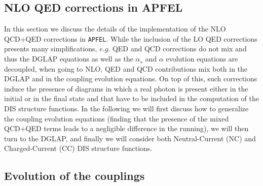 \newpage



\appendix

\begin{widetext}
\section{NLO QED corrections in APFEL} \label{sec:appendixAPFEL}

In this section we discuss the details of the implementation of the
NLO QCD+QED corrections in {\tt APFEL}. While the inclusion of the LO
QED corrections presents many simplifications, $e.g.$ QED and QCD
corrections do not mix and thus the DGLAP equations as well as the
$\alpha_s$ and $\alpha$ evolution equations are decoupled, when going
to NLO, QED and QCD contributions mix both in the DGLAP and in the
coupling evolution equations. On top of this, such corrections induce
the presence of diagrams in which a real photon is present either in
the initial or in the final state and that have to be included in the
computation of the DIS structure functions. In the following we will
first discuss how to generalize the coupling evolution equations
(finding that the presence of the mixed QCD+QED terms leads to a
negligible difference in the running), we will then turn to the DGLAP,
and finally we will consider both Neutral-Current (NC) and
Charged-Current (CC) DIS structure functions.

\subsection{Evolution of the couplings}


\end{widetext}
